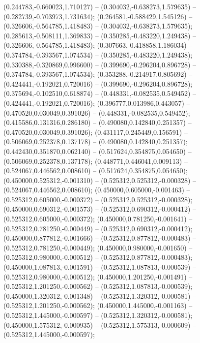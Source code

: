  (0.244783,-0.660023,1.710127) -- (0.304032,-0.638273,1.579635) -- (0.282739,-0.703973,1.731634);
 (0.264581,-0.588429,1.545126) -- (0.326606,-0.564785,1.418483) -- (0.304032,-0.638273,1.579635);
 (0.285613,-0.508111,1.369833) -- (0.350285,-0.483220,1.249438) -- (0.326606,-0.564785,1.418483);
 (0.307663,-0.418858,1.186034) -- (0.374784,-0.393567,1.074534) -- (0.350285,-0.483220,1.249438);
 (0.330388,-0.320869,0.996600) -- (0.399690,-0.296204,0.896728) -- (0.374784,-0.393567,1.074534);
 (0.353288,-0.214917,0.805692) -- (0.424441,-0.192021,0.720016) -- (0.399690,-0.296204,0.896728);
 (0.375694,-0.102510,0.618874) -- (0.448331,-0.082535,0.549452) -- (0.424441,-0.192021,0.720016);
 (0.396777,0.013986,0.443057) -- (0.470520,0.030049,0.391026) -- (0.448331,-0.082535,0.549452);
 (0.415586,0.131316,0.286180) -- (0.490080,0.142840,0.251357) -- (0.470520,0.030049,0.391026);
 (0.431117,0.245449,0.156591) -- (0.506069,0.252378,0.137178) -- (0.490080,0.142840,0.251357);
 (0.442430,0.351870,0.062140) -- (0.517624,0.354875,0.054650) -- (0.506069,0.252378,0.137178);
 (0.448771,0.446041,0.009113) -- (0.524067,0.446562,0.008610) -- (0.517624,0.354875,0.054650);
 (0.450000,0.525312,-0.001310) -- (0.525312,0.525312,-0.000328) -- (0.524067,0.446562,0.008610);
 (0.450000,0.605000,-0.001463) -- (0.525312,0.605000,-0.000372) -- (0.525312,0.525312,-0.000328);
 (0.450000,0.690312,-0.001573) -- (0.525312,0.690312,-0.000412) -- (0.525312,0.605000,-0.000372);
 (0.450000,0.781250,-0.001641) -- (0.525312,0.781250,-0.000449) -- (0.525312,0.690312,-0.000412);
 (0.450000,0.877812,-0.001666) -- (0.525312,0.877812,-0.000483) -- (0.525312,0.781250,-0.000449);
 (0.450000,0.980000,-0.001650) -- (0.525312,0.980000,-0.000512) -- (0.525312,0.877812,-0.000483);
 (0.450000,1.087813,-0.001591) -- (0.525312,1.087813,-0.000539) -- (0.525312,0.980000,-0.000512);
 (0.450000,1.201250,-0.001491) -- (0.525312,1.201250,-0.000562) -- (0.525312,1.087813,-0.000539);
 (0.450000,1.320312,-0.001348) -- (0.525312,1.320312,-0.000581) -- (0.525312,1.201250,-0.000562);
 (0.450000,1.445000,-0.001163) -- (0.525312,1.445000,-0.000597) -- (0.525312,1.320312,-0.000581);
 (0.450000,1.575312,-0.000935) -- (0.525312,1.575313,-0.000609) -- (0.525312,1.445000,-0.000597);
